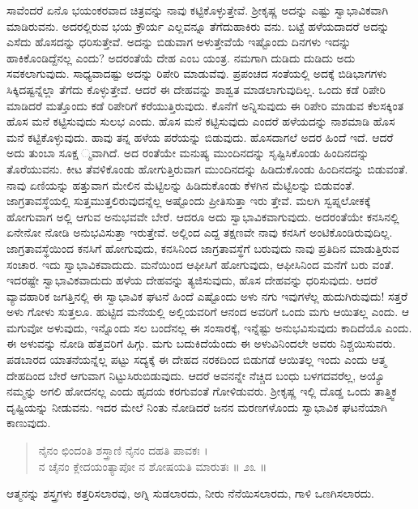 ಸಾವೆಂದರೆ ಏನೊ ಭಯಂಕರವಾದ ಚಿತ್ರವನ್ನು ನಾವು ಕಟ್ಟಿಕೊಳ್ಳುತ್ತೇವೆ. ಶ್ರೀಕೃಷ್ಣ ಅದನ್ನು ಎಷ್ಟು ಸ್ವಾಭಾವಿಕವಾಗಿ ಮಾಡಿರುವನು. ಅದರಲ್ಲಿರುವ ಭಯ ಕ್ರೌರ್ಯ ಎಲ್ಲವನ್ನೂ ತೆಗೆದುಹಾಕಿರು ವನು. ಬಟ್ಟೆ ಹಳೆಯದಾದರೆ ಅದನ್ನು ಎಸೆದು ಹೊಸದನ್ನು ಧರಿಸುತ್ತೇವೆ. ಅದನ್ನು ಬಿಡುವಾಗ ಅಳುತ್ತೇವೆಯೆ ಇಷ್ಟೊಂದು ದಿನಗಳು ಇದನ್ನು ಹಾಕಿಕೊಂಡಿದ್ದೆನಲ್ಲ ಎಂದು? ಅದರಂತೆಯೆ ದೇಹ ಎಂಬ ಯಂತ್ರ. ನಮಗಾಗಿ ದುಡಿದು ದುಡಿದು ಅದು ಸವಕಲಾಗುವುದು. ಸಾಧ್ಯವಾದಷ್ಟು ಅದನ್ನು ರಿಪೇರಿ ಮಾಡುವೆವು. ಪ್ರಪಂಚದ ಸಂತೆಯಲ್ಲಿ ಅದಕ್ಕೆ ಬಿಡಿಭಾಗಗಳು ಸಿಕ್ಕಿದಷ್ಟನ್ನೆಲ್ಲಾ ತೆಗೆದು ಕೊಳ್ಳುತ್ತೇವೆ. ಆದರೆ ಈ ದೇಹವನ್ನು ಶಾಶ್ವತ ಮಾಡಲಾಗುವುದಿಲ್ಲ. ಒಂದು ಕಡೆ ರಿಪೇರಿ ಮಾಡಿದರೆ ಮತ್ತೊಂದು ಕಡೆ ರಿಪೇರಿಗೆ ಕರೆಯುತ್ತಿರುವುದು. ಕೊನೆಗೆ ಅನ್ನಿಸುವುದು ಈ ರಿಪೇರಿ ಮಾಡುವ ಕೆಲಸಕ್ಕಿಂತ ಹೊಸ ಮನೆ ಕಟ್ಟಿಸುವುದು ಸುಲಭ ಎಂದು. ಹೊಸ ಮನೆ ಕಟ್ಟಿಸುವುದು ಎಂದರೆ ಹಳೆಯದನ್ನು ನಾಶಮಾಡಿ ಹೊಸ ಮನೆ ಕಟ್ಟಿಕೊಳ್ಳುವುದು. ಹಾವು ತನ್ನ ಹಳೆಯ ಪರೆಯನ್ನು ಬಿಡುವುದು. ಹೊಸದಾಗಲೆ ಅದರ ಹಿಂದೆ ಇದೆ. ಆದರೆ ಅದು ತುಂಬಾ ಸೂಕ್ಷ ್ಮವಾಗಿದೆ. ಅದ ರಂತೆಯೇ ಮನುಷ್ಯ ಮುಂದಿನದನ್ನು ಸೃಷ್ಟಿಸಿಕೊಂಡು ಹಿಂದಿನದನ್ನು ತೊರೆಯುವನು. ಕೀಟ ತೆವಳಿಕೊಂಡು ಹೋಗುತ್ತಿರುವಾಗ ಮುಂದಿನದನ್ನು ಹಿಡಿದುಕೊಂಡು ಹಿಂದಿನದನ್ನು ಬಿಡುವಂತೆ. ನಾವು ಏಣಿಯನ್ನು ಹತ್ತುವಾಗ ಮೇಲಿನ ಮೆಟ್ಟಿಲನ್ನು ಹಿಡಿದುಕೊಂಡು ಕೆಳಗಿನ ಮೆಟ್ಟಿಲನ್ನು ಬಿಡುವಂತೆ. ಜಾಗ್ರತಾವಸ್ಥೆಯಲ್ಲಿ ಸುತ್ತಮುತ್ತಲಿರುವುದನ್ನೆಲ್ಲ ಅಷ್ಟೊಂದು ಪ್ರೀತಿಸುತ್ತಾ ಇರು ತ್ತೇವೆ. ಮಲಗಿ ಸ್ವಪ್ನಲೋಕಕ್ಕೆ ಹೋಗುವಾಗ ಅಲ್ಲಿ ಆಗುವ ಅನುಭವವೇ ಬೇರೆ. ಆದರೂ ಅದು ಸ್ವಾಭಾವಿಕವಾಗುವುದು. ಅದರಂತೆಯೇ ಕನಸಿನಲ್ಲಿ ಏನೇನೋ ನೋಡಿ ಅನುಭವಿಸುತ್ತಾ ಇರುತ್ತೇವೆ. ಅಲ್ಲಿಂದ ಎದ್ದ ತಕ್ಷಣವೇ ನಾವು ಕನಸಿಗೆ ಅಂಟಿಕೊಂಡಿರುವುದಿಲ್ಲ. ಜಾಗ್ರತಾವಸ್ಥೆಯಿಂದ ಕನಸಿಗೆ ಹೋಗುವುದು, ಕನಸಿನಿಂದ ಜಾಗ್ರತಾವಸ್ಥೆಗೆ ಬರುವುದು ನಾವು ಪ್ರತಿದಿನ ಮಾಡುತ್ತಿರುವ ಸಂಚಾರ. ಇದು ಸ್ವಾಭಾವಿಕವಾದುದು. ಮನೆಯಿಂದ ಆಫೀಸಿಗೆ ಹೋಗುವುದು, ಆಫೀಸಿನಿಂದ ಮನೆಗೆ ಬರು ವಂತೆ. ಇದರಷ್ಟೇ ಸ್ವಾಭಾವಿಕವಾದುದು ಹಳೆಯ ದೇಹವನ್ನು ತ್ಯಜಿಸುವುದು, ಹೊಸ ದೇಹವನ್ನು ಧರಿಸುವುದು. ಆದರೆ ವ್ಯಾವಹಾರಿಕ ಜಗತ್ತಿನಲ್ಲಿ ಈ ಸ್ವಾಭಾವಿಕ ಘಟನೆ ಹಿಂದೆ ಎಷ್ಟೊಂದು ಅಳು ನಗು ಇವುಗಳೆಲ್ಲ ಹುದುಗಿರುವುದು! ಸತ್ತರೆ ಅಳು ಗೋಳು ಸುತ್ತಲೂ. ಹುಟ್ಟಿದ ಮನೆಯಲ್ಲಿ ಅಲ್ಲಿಯವರಿಗೆ ಆನಂದ ಅವರಿಗೆ ಒಂದು ಮಗು ಆಯಿತಲ್ಲ ಎಂದು. ಆ ಮಗುವೋ ಅಳುವುದು, ಇನ್ನೊಂದು ಸಲ ಬಂದೆನಲ್ಲ ಈ ಸಂಸಾರಕ್ಕೆ, ಇನ್ನೆಷ್ಟು ಅನುಭವಿಸುವುದು ಕಾದಿದೆಯೊ ಎಂದು. ಈ ಅಳುವನ್ನು ನೋಡಿ ಹೆತ್ತವರಿಗೆ ಹಿಗ್ಗು. ಮಗು ಬದುಕಿದೆಯೆಂದು ಈ ಅಳುವಿನಿಂದಲೇ ಅವರು ನಿಶ್ಚಯಿಸುವರು. ಪಡಬಾರದ ಯಾತನೆಯನ್ನೆಲ್ಲ ಪಟ್ಟು ಸದ್ಯಕ್ಕೆ ಈ ದೇಹದ ನರಕದಿಂದ ಬಿಡುಗಡೆ ಆಯಿತಲ್ಲ ಇಂದು ಎಂದು ಆತ್ಮ ದೇಹದಿಂದ ಬೇರೆ ಆಗುವಾಗ ನಿಟ್ಟುಸಿರುಬಿಡುವುದು. ಆದರೆ ಅವನನ್ನೇ ನೆಚ್ಚಿದ ಬಂಧು ಬಳಗದವರೆಲ್ಲ, ಅಯ್ಯೊ ನಮ್ಮನ್ನು ಅಗಲಿ ಹೋದನಲ್ಲ ಎಂದು ಹೃದಯ ಕರಗುವಂತೆ ಗೋಳಿಡುವರು. ಶ್ರೀಕೃಷ್ಣ ಇಲ್ಲಿ ದೊಡ್ಡ ಒಂದು ತಾತ್ತ್ವಿಕ ದೃಷ್ಟಿಯನ್ನು ನೀಡುವನು. ಇದರ ಮೇಲೆ ನಿಂತು ನೋಡಿದರೆ ಜನನ ಮರಣಗಳೊಂದು ಸ್ವಾಭಾವಿಕ ಘಟನೆಯಾಗಿ ಕಾಣುವುದು.

\begin{verse}
ನೈನಂ ಛಿಂದಂತಿ ಶಸ್ತ್ರಾಣಿ ನೈನಂ ದಹತಿ ಪಾವಕಃ ।\\ನ ಚೈನಂ ಕ್ಲೇದಯಂತ್ಯಾಪೋ ನ ಶೋಷಯತಿ ಮಾರುತಃ \num{॥ ೨೩ ॥}
\end{verse}

{\small ಆತ್ಮನನ್ನು ಶಸ್ತ್ರಗಳು ಕತ್ತರಿಸಲಾರವು, ಅಗ್ನಿ ಸುಡಲಾರದು, ನೀರು ನೆನೆಯಿಸಲಾರದು, ಗಾಳಿ ಒಣಗಿಸಲಾರದು.}

